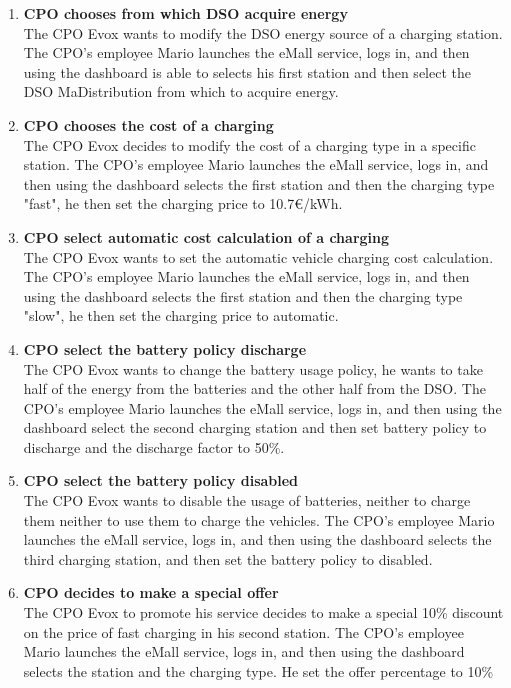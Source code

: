 \begin{enumerate}
    \item \textbf{CPO chooses from which DSO acquire energy}\\
    The CPO Evox wants to modify the DSO energy source of a charging station. The CPO's employee Mario launches the eMall service, logs in, and then using the dashboard is able to selects his first station and then select the DSO MaDistribution from which to acquire energy.
    \item \textbf{CPO chooses the cost of a charging}\\
    The CPO Evox decides to modify the cost of a charging type in a specific station. The CPO's employee Mario launches the eMall service, logs in, and then using the dashboard selects the first station and then the charging type "fast", he then set the charging price to 10.7€/kWh.    
    \item \textbf{CPO select automatic cost calculation of a charging}\\
    The CPO Evox wants to set the automatic vehicle charging cost calculation. The CPO's employee Mario launches the eMall service, logs in, and then using the dashboard selects the first station and then the charging type "slow", he then set the charging price to automatic.      
    \item \textbf{CPO select the battery policy discharge}\\
    The CPO Evox wants to change the battery usage policy, he wants to take half of the energy from the batteries and the other half from the DSO. The CPO's employee Mario launches the eMall service, logs in, and then using the dashboard select the second charging station and then set battery policy to discharge and the discharge factor to 50\%.
    \item \textbf{CPO select the battery policy disabled}\\
    The CPO Evox wants to disable the usage of batteries, neither to charge them neither to use them to charge the vehicles. The CPO's employee Mario launches the eMall service, logs in, and then using the dashboard selects the third charging station, and then set the battery policy to disabled.
    \item \textbf{CPO decides to make a special offer}\\
    The CPO Evox to promote his service decides to make a special 10\% discount on the price of fast charging in his second station. The CPO's employee Mario launches the eMall service, logs in, and then using the dashboard selects the station and the charging type. He set the offer percentage to 10\%

\end{enumerate}
